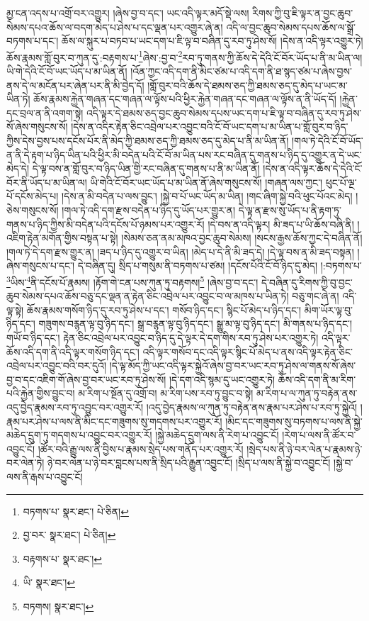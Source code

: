 མྱ་ངན་འདས་པ་འགྲོ་བར་འགྱུར། །ཞེས་བྱ་བ་དང་། ཡང་འདི་ལྟར་མདོ་སྡེ་ལས། རིགས་ཀྱི་བུ་ཇི་ལྟར་ན་བྱང་ཆུབ་སེམས་དཔའ་ཆོས་ལ་བདག་མེད་པ་ཤེས་པ་དང་ལྡན་པར་འགྱུར་ཞེ་ན། འདི་ལ་བྱང་ཆུབ་སེམས་དཔས་ཆོས་ལ་སྒྲོ་བཏགས་པ་དང་། ཆོས་ལ་སྐུར་པ་བཏབ་པ་ཡང་དག་པ་ཇི་ལྟ་བ་བཞིན་དུ་རབ་ཏུ་ཤེས་སོ། །དེས་ན་འདི་ལྟར་འགྱུར་ཏེ། ཆོས་རྣམས་གློ་བུར་བ་ཀུན་དུ་:བརྟགས་པ་\footnote{བཏགས་པ་  སྣར་ཐང་།  པེ་ཅིན། }ཞེས་:བྱ་བ་\footnote{བྱ་བར་  སྣར་ཐང་།  པེ་ཅིན། }རབ་ཏུ་གནས་ཀྱི་ཆོས་དེ་དེའི་ངོ་བོར་ཡོད་པ་ནི་མ་ཡིན་ལ། ཡི་གེ་དེའི་ངོ་བོ་ཡང་ཡོད་པ་མ་ཡིན་ནོ། །འོན་ཀྱང་འདི་དག་ནི་མིང་ཙམ་པ་འདི་དག་ནི་ཐ་སྙད་ཙམ་པ་ཞེས་བྱས་ནས་དེ་ལ་མངོན་པར་ཞེན་པར་ནི་མི་བྱེད་དོ། །གློ་བུར་བའི་ཆོས་དེ་ཐམས་ཅད་ཀྱི་ཐམས་ཅད་དུ་མེད་པ་ཡང་མ་ཡིན་ཏེ། ཆོས་རྣམས་རྐྱེན་གཞན་དང་གཞན་ལ་ལྟོས་པའི་ཕྱིར་རྐྱེན་གཞན་དང་གཞན་ལ་ལྟོས་ན་ནི་ཡོད་དོ། །རྐྱེན་དང་བྲལ་ན་ནི་འགག་སྟེ། འདི་ལྟར་དེ་ཐམས་ཅད་བྱང་ཆུབ་སེམས་དཔས་ཡང་དག་པ་ཇི་ལྟ་བ་བཞིན་དུ་རབ་ཏུ་ཤེས་སོ་ཞེས་གསུངས་སོ། །དེས་ན་འདིར་རྟེན་ཅིང་འབྲེལ་པར་འབྱུང་བའི་ངོ་བོ་ཡང་དག་པ་མ་ཡིན་པ་གློ་བུར་བ་ཉིད་ཀྱིས་དེས་བྱས་པས་དངོས་པོར་ནི་མེད་ཀྱི་ཐམས་ཅད་ཀྱི་ཐམས་ཅད་དུ་མེད་པ་ནི་མ་ཡིན་ནོ། །གལ་ཏེ་དེའི་ངོ་བོ་ཡོད་ན་ནི་དེ་རྟག་པ་ཉིད་ཡིན་པའི་ཕྱིར་མི་བདེན་པའི་ངོ་བོ་མ་ཡིན་པས་རང་བཞིན་དུ་གནས་པ་ཉིད་དུ་འགྱུར་ན་དེ་ཡང་མེད་དེ། དེ་ལྟ་བས་ན་གློ་བུར་བ་ཉིད་ཡིན་གྱི་རང་བཞིན་དུ་གནས་པ་ནི་མ་ཡིན་ནོ། །དེས་ན་འདི་ལྟར་ཆོས་དེ་དེའི་ངོ་བོར་ནི་ཡོད་པ་མ་ཡིན་ལ། ཡི་གེའི་ངོ་བོར་ཡང་ཡོད་པ་མ་ཡིན་ནོ་ཞེས་གསུངས་སོ། །གཞན་ལས་ཀྱང་། ཕུང་པོ་ལྔ་པོ་དངོས་མེད་པ། །དེས་ན་མི་བདེན་པ་ལས་བྱུང་། །སྐྱེ་བ་པོ་ཡང་ཡོད་མ་ཡིན། །གང་ཞིག་སྐྱེ་བའི་ཕུང་པོའང་མེད། །ཅེས་གསུངས་སོ། །གལ་ཏེ་འདི་དག་རྫས་བདེན་པ་ཉིད་དུ་ཡོད་པར་གྱུར་ན། དེ་ལྟ་ན་རྫས་སུ་ཡོད་པ་ནི་རྟག་ཏུ་གནས་པ་ཉིད་ཀྱིས་མི་བདེན་པའི་དངོས་པོ་ཉམས་པར་འགྱུར་རོ། །དེ་བས་ན་འདི་ལྟར། མི་ཟད་པ་ཡི་ཆོས་བཞི་ནི། །འཇིག་རྟེན་མགོན་གྱིས་བསྟན་པ་སྟེ། །སེམས་ཅན་ནམ་མཁའ་བྱང་ཆུབ་སེམས། །སངས་རྒྱས་ཆོས་ཀྱང་དེ་བཞིན་ནོ། །གལ་ཏེ་དེ་དག་རྫས་གྱུར་ན། །ཟད་པ་ཉིད་དུ་འགྱུར་བ་ཡིན། །མེད་པ་དེ་ནི་མི་ཟད་དེ། །དེ་ལྟ་བས་ན་མི་ཟད་བསྟན། །ཞེས་གསུངས་པ་དང་། དེ་བཞིན་དུ། སྲིད་པ་གསུམ་ནི་བཏགས་པ་ཙམ། །དངོས་པོའི་ངོ་བོ་ཉིད་དུ་མེད། །:བཏགས་པ་\footnote{བརྟགས་པ་  སྣར་ཐང་། }ཡིས་\footnote{ཡི་  སྣར་ཐང་། }ནི་དངོས་པོ་རྣམས། །རྟོག་གེ་ངན་པས་ཀུན་ཏུ་བརྟགས།\footnote{བཏགས།  སྣར་ཐང་། } །ཞེས་བྱ་བ་དང་། དེ་བཞིན་དུ་རིགས་ཀྱི་བུ་བྱང་ཆུབ་སེམས་དཔའ་ཆོས་བཅུ་དང་ལྡན་ན་རྟེན་ཅིང་འབྲེལ་པར་འབྱུང་བ་ལ་མཁས་པ་ཡིན་ཏེ། བཅུ་གང་ཞེ་ན། འདི་ལྟ་སྟེ། ཆོས་རྣམས་གསོག་ཉིད་དུ་རབ་ཏུ་ཤེས་པ་དང་། གསོབ་ཉིད་དང་། སྙིང་པོ་མེད་པ་ཉིད་དང་། མིག་ཡོར་ལྟ་བུ་ཉིད་དང་། གཟུགས་བརྙན་ལྟ་བུ་ཉིད་དང་། སྒྲ་བརྙན་ལྟ་བུ་ཉིད་དང་། སྒྱུ་མ་ལྟ་བུ་ཉིད་དང་། མི་གནས་པ་ཉིད་དང་། གཡོ་བ་ཉིད་དང་། རྟེན་ཅིང་འབྲེལ་པར་འབྱུང་བ་ཉིད་དུ་དེ་ལྟར་དེ་དག་གིས་རབ་ཏུ་ཤེས་པར་འགྱུར་ཏེ། འདི་ལྟར་ཆོས་འདི་དག་ནི་འདི་ལྟར་གསོག་ཉིད་དང་། འདི་ལྟར་གསོབ་དང་འདི་ལྟར་སྙིང་པོ་མེད་པ་ནས་འདི་ལྟར་རྟེན་ཅིང་འབྲེལ་པར་འབྱུང་བའི་བར་དུའོ། །དེ་ལྟ་མོད་ཀྱི་ཡང་འདི་ལྟར་སྐྱེའོ་ཞེས་བྱ་བར་ཡང་རབ་ཏུ་ཤེས་ལ་གནས་སོ་ཞེས་བྱ་བ་དང་འཇིག་གོ་ཞེས་བྱ་བར་ཡང་རབ་ཏུ་ཤེས་སོ། །དེ་དག་འདི་སྙམ་དུ་ཡང་འགྱུར་ཏེ། ཆོས་འདི་དག་ནི་མ་རིག་པའི་རྐྱེན་གྱིས་བྱུང་བ། མ་རིག་པ་སྔོན་དུ་འགྲོ་བ། མ་རིག་པས་རབ་ཏུ་བྱུང་བ་སྟེ། མ་རིག་པ་ལ་ཀུན་ཏུ་བརྟེན་ནས་འདུ་བྱེད་རྣམས་རབ་ཏུ་འབྱུང་བར་འགྱུར་རོ། །འདུ་བྱེད་རྣམས་ལ་ཀུན་ཏུ་བརྟེན་ནས་རྣམ་པར་ཤེས་པ་རབ་ཏུ་སྐྱེའོ། །རྣམ་པར་ཤེས་པ་ལས་ནི་མིང་དང་གཟུགས་སུ་གདགས་པར་འགྱུར་རོ། །མིང་དང་གཟུགས་སུ་བཏགས་པ་ལས་ནི་སྐྱེ་མཆེད་དྲུག་ཏུ་གདགས་པ་འབྱུང་བར་འགྱུར་རོ། །སྐྱེ་མཆེད་དྲུག་ལས་ནི་རེག་པ་འབྱུང་ངོ། །རེག་པ་ལས་ནི་ཚོར་བ་འབྱུང་ངོ། །ཚོར་བའི་རྒྱུ་ལས་ནི་བྱིས་པ་རྣམས་སྲེད་པས་གནོད་པར་འགྱུར་རོ། །སྲེད་པས་ནི་ཉེ་བར་ལེན་པ་རྣམས་ཉེ་བར་ལེན་ཏེ། ཉེ་བར་ལེན་པ་ཉེ་བར་བླངས་པས་ནི་སྲིད་པའི་རྒྱུན་འབྱུང་ངོ། །སྲིད་པ་ལས་ནི་སྐྱེ་བ་འབྱུང་ངོ། །སྐྱེ་བ་ལས་ནི་རྒས་པ་འབྱུང་ངོ། 